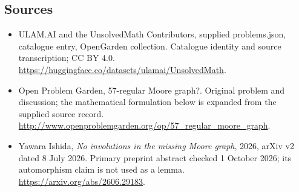 \documentclass[11pt,a4paper]{article}
\begin{document}
\subsection{Sources}
\begin{itemize}
\item[S1] ULAM.AI and the UnsolvedMath Contributors, supplied problems.json, catalogue entry, OpenGarden collection. Catalogue identity and source transcription; CC BY 4.0.
\url{https://huggingface.co/datasets/ulamai/UnsolvedMath}.
\item[S2] Open Problem Garden, 57-regular Moore graph?. Original problem and discussion; the mathematical formulation below is expanded from the supplied source record.
\url{http://www.openproblemgarden.org/op/57_regular_moore_graph}.

\item[R1] Yawara Ishida, \emph{No involutions in the missing Moore graph},
2026, arXiv v2 dated 8 July 2026. Primary preprint abstract checked
1 October 2026; its automorphism claim is not used as a lemma.
\url{https://arxiv.org/abs/2606.29183}.

\end{itemize}
\end{document}
